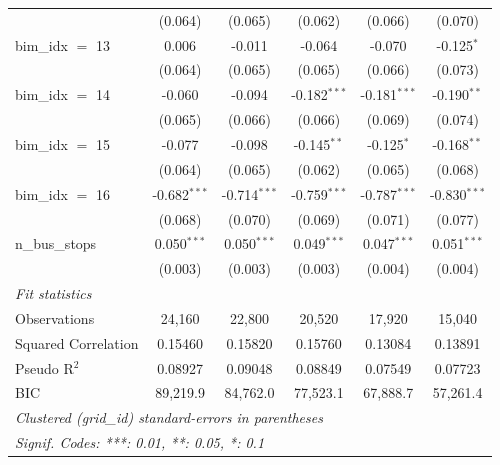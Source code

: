 \begin{tabular}{lccccc}
                       & (0.064)        & (0.065)        & (0.062)        & (0.066)        & (0.070)\\   
   bim\_idx $=$ 13     & 0.006          & -0.011         & -0.064         & -0.070         & -0.125$^{*}$\\   
                       & (0.064)        & (0.065)        & (0.065)        & (0.066)        & (0.073)\\   
   bim\_idx $=$ 14     & -0.060         & -0.094         & -0.182$^{***}$ & -0.181$^{***}$ & -0.190$^{**}$\\   
                       & (0.065)        & (0.066)        & (0.066)        & (0.069)        & (0.074)\\   
   bim\_idx $=$ 15     & -0.077         & -0.098         & -0.145$^{**}$  & -0.125$^{*}$   & -0.168$^{**}$\\   
                       & (0.064)        & (0.065)        & (0.062)        & (0.065)        & (0.068)\\   
   bim\_idx $=$ 16     & -0.682$^{***}$ & -0.714$^{***}$ & -0.759$^{***}$ & -0.787$^{***}$ & -0.830$^{***}$\\   
                       & (0.068)        & (0.070)        & (0.069)        & (0.071)        & (0.077)\\   
   n\_bus\_stops       & 0.050$^{***}$  & 0.050$^{***}$  & 0.049$^{***}$  & 0.047$^{***}$  & 0.051$^{***}$\\   
                       & (0.003)        & (0.003)        & (0.003)        & (0.004)        & (0.004)\\   
   \midrule
   \emph{Fit statistics}\\
   Observations        & 24,160         & 22,800         & 20,520         & 17,920         & 15,040\\  
   Squared Correlation & 0.15460        & 0.15820        & 0.15760        & 0.13084        & 0.13891\\  
   Pseudo R$^2$        & 0.08927        & 0.09048        & 0.08849        & 0.07549        & 0.07723\\  
   BIC                 & 89,219.9       & 84,762.0       & 77,523.1       & 67,888.7       & 57,261.4\\  
   \midrule \midrule
   \multicolumn{6}{l}{\emph{Clustered (grid\_id) standard-errors in parentheses}}\\
   \multicolumn{6}{l}{\emph{Signif. Codes: ***: 0.01, **: 0.05, *: 0.1}}\\
\end{tabular}
\par\endgroup


